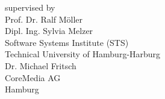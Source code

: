 \documentclass[12pt,a4paper]{extreport}
\begin{document}
\begin{titlepage}
\begin{minipage}[b]{1\linewidth}
\begin{flushright}
\bigskip 
supervised by\\
\large
Prof. Dr. Ralf M\"oller\\
Dipl. Ing. Sylvia Melzer\\
\large
Software Systems Institute (STS)\\
Technical University of Hamburg-Harburg\\
\bigskip
Dr. Michael Fritsch\\
CoreMedia AG\\
Hamburg\\
\bigskip 
\bigskip
\end{flushright}
\end{minipage}

\end{titlepage}

%

{\renewcommand{\thepage}{}


}


\makeatletter
\renewcommand{\fnum@figure}{\textbf{Figure~\thefigure}}
\makeatother

\tableofcontents
{}
\listoffigures



% 
% 
% 
\printglossaries


\begin{appendix}

\end{appendix}


% 



\end{document}
